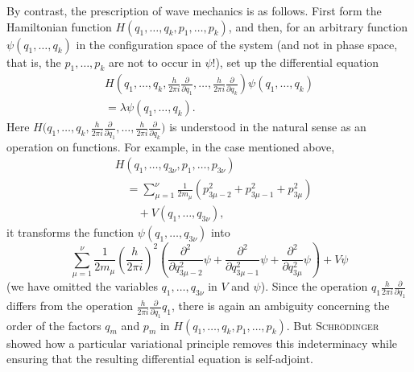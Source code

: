 \documentclass[fontsize=13pt,twoside,openany,headings=normal,parskip=false,bookmarkpackage=false,DIV=calc]{scrbook}
\begin{document}
By contrast, the prescription of wave mechanics is as follows. First form the Hamiltonian function $H(q_1,\ldots,q_k,p_1,\ldots,p_k)$, and then, for an arbitrary function $\psi(q_1,\ldots,q_k)$ in the configuration space of the system (and not in phase space, that is, the $p_1,\ldots,p_k$ are not to occur in $\psi$!), set up the differential equation
\begin{gather*}
 H\left(q_1,\ldots,q_k,\frac{h}{2\pi i}\frac{\partial}{\partial q_1},
 \ldots,\frac{h}{2\pi i}\frac{\partial}{\partial q_k}\right)\psi(q_1,\ldots,q_k)\\
 =\lambda\psi(q_1,\ldots,q_k).
\end{gather*}
Here $H\bigl(q_1,\ldots,q_k,\frac{h}{2\pi i}\frac{\partial}{\partial q_1},\ldots,
\frac{h}{2\pi i}\frac{\partial}{\partial q_k}\bigr)$ is understood in the natural sense as an operation on functions. For example, in the case mentioned above,
\begin{align*}
 &H(q_1,\ldots,q_{3\nu},p_1,\ldots,p_{3\nu})\\
 &\quad=\sum_{\mu=1}^{\nu}\frac{1}{2m_\mu}(p_{3\mu-2}^2+p_{3\mu-1}^2+p_{3\mu}^2)\\
 &\qquad+V(q_1,\ldots,q_{3\nu}),
\end{align*}
it transforms the function $\psi(q_1,\ldots,q_{3\nu})$ into
\[
 \sum_{\mu=1}^{\nu}\frac{1}{2m_\mu}\left(\frac{h}{2\pi i}\right)^2
 \left(\frac{\partial^2}{\partial q_{3\mu-2}^2}\psi
 +\frac{\partial^2}{\partial q_{3\mu-1}^2}\psi
 +\frac{\partial^2}{\partial q_{3\mu}^2}\psi\right)+V\psi
\]
\hypertarget{origpage-8}{}%
(we have omitted the variables $q_1,\ldots,q_{3\nu}$ in $V$ and $\psi$). Since the operation $q_1\frac{h}{2\pi i}\frac{\partial}{\partial q_1}$ differs from the operation $\frac{h}{2\pi i}\frac{\partial}{\partial q_1}q_1$, there is again an ambiguity concerning the order of the factors $q_m$ and $p_m$ in $H(q_1,\ldots,q_k,p_1,\ldots,p_k)$. But \textsc{Schrödinger} showed how a particular variational principle removes this indeterminacy while ensuring that the resulting differential equation is self-adjoint.
\end{document}

